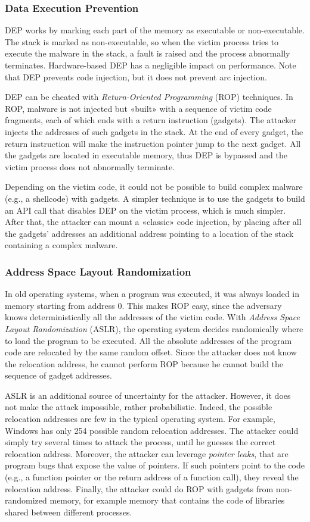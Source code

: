 \documentclass[a4paper,12pt]{article}
\begin{document}
\subsubsection{Data Execution Prevention}
DEP works by marking each part of the memory as executable or non-executable. The stack is marked as non-executable, so when the victim process tries to execute the malware in the stack, a fault is raised and the process abnormally terminates. Hardware-based DEP has a negligible impact on performance. Note that DEP prevents code injection, but it does not prevent arc injection.

DEP can be cheated with \textit{Return-Oriented Programming} (ROP) techniques. In ROP, malware is not injected but «built» with a sequence of victim code fragments, each of which ends with a return instruction (gadgets). The attacker injects the addresses of such gadgets in the stack. At the end of every gadget, the return instruction will make the instruction pointer jump to the next gadget. All the gadgets are located in executable memory, thus DEP is bypassed and the victim process does not abnormally terminate.

Depending on the victim code, it could not be possible to build complex malware (e.g., a shellcode) with gadgets. A simpler technique is to use the gadgets to build an API call that disables DEP on the victim process, which is much simpler. After that, the attacker can mount a «classic» code injection, by placing after all the gadgets’ addresses an additional address pointing to a location of the stack containing a complex malware.

\subsubsection{Address Space Layout Randomization}
In old operating systems, when a program was executed, it was always loaded in memory starting from address 0. This makes ROP easy, since the adversary knows deterministically all the addresses of the victim code. With \textit{Address Space Layout Randomization} (ASLR), the operating system decides randomically where to load the program to be executed. All the absolute addresses of the program code are relocated by the same random offset. Since the attacker does not know the relocation address, he cannot perform ROP because he cannot build the sequence of gadget addresses.

ASLR is an additional source of uncertainty for the attacker. However, it does not make the attack impossible, rather probabilistic. Indeed, the possible relocation addresses are few in the typical operating system. For example, Windows has only 254 possible random relocation addresses. The attacker could simply try several times to attack the process, until he guesses the correct relocation address. Moreover, the attacker can leverage \textit{pointer leaks}, that are program bugs that expose the value of pointers. If such pointers point to the code (e.g., a function pointer or the return address of a function call), they reveal the relocation address. Finally, the attacker could do ROP with gadgets from non-randomized memory, for example memory that contains the code of libraries shared between different processes.
\end{document}
